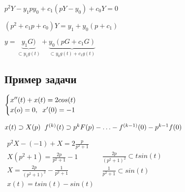\vspace{0.5cm}
\begin{Large}
$
p^2Y-y_1py_0 + c_1(pY - y_0) + c_0Y = 0
$

$
(p^2 + c_1p + c_0)Y = y_1 + y_0(p+c_1)
$

$
y = \underbrace{y_1G)}_{\subset y_1g(t)} 
+
\underbrace{y_0(pG + c_1G)}_{\subset y_0g(t) + c_1g(t)}
$
\end{Large}


\newpage
\subsection{Пример задачи}

\vspace{0.5cm}
$
\begin{cases}
	x^{\prime\prime}(t) + x(t) = 2cos(t) 
	\\
	x(o) = 0, 	\text{\hspace{0.2cm}} x^{\prime}(0) = -1
\end{cases}
$

\vspace{0.5cm}
$
x(t) \supset X(p) \text{\hspace{0.2cm}} f^{(k)}(t) \supset p^kF(p) - \ldots
-
f^{(k-1)}(0)- p^{k-1}f(0)
$

\vspace{0.5cm}
\begin{Large}
$
\begin{matrix}
p^2X - (-1)  + X = 2\frac{p}{p^2 + 1} \\
X(p^2+1) = \frac{2p}{p^2+1} - 1 \\
X = \frac{2p}{(p^2 + 1)^2} - \frac{1}{p^2 + 1} \\
x(t) = tsin(t) - sin(t)
\end{matrix}
$
\hspace{2cm}
$
\begin{matrix}
	 \frac{2p}{(p^2 + 1)^2}\subset tsin(t) \\
	 \frac{1}{p^2 + 1} \subset sin(t)
\end{matrix}
$

\end{Large}


